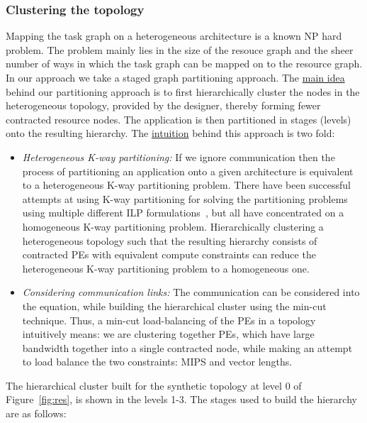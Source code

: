 \subsubsection{Clustering the topology}
\label{sec:clustering-topology}

Mapping the task graph on a heterogeneous architecture is a known NP
hard problem. The problem mainly lies in the size of the resouce graph
and the sheer number of ways in which the task graph can be mapped on to
the resource graph. In our approach we take a staged graph partitioning
approach. The \underline{main idea} behind our partitioning approach is
to first hierarchically cluster the nodes in the heterogeneous topology,
provided by the designer, thereby forming fewer contracted resource
nodes. The application is then partitioned in stages (levels) onto the
resulting hierarchy. The \underline{intuition} behind this approach is
two fold:

\begin{itemize}

\item \textit{Heterogeneous K-way partitioning:} If we ignore
  communication then the process of partitioning an application onto a
  given architecture is equivalent to a heterogeneous K-way partitioning
  problem. There have been successful attempts at using K-way
  partitioning for solving the partitioning problems using multiple
  different ILP formulations~\cite{fsar11}, but all have concentrated on
  a homogeneous K-way partitioning problem. Hierarchically clustering a
  heterogeneous topology such that the resulting hierarchy consists of
  contracted PEs with equivalent compute constraints can reduce the
  heterogeneous K-way partitioning problem to a homogeneous one.

\item \textit{Considering communication links:} The communication can be
  considered into the equation, while building the hierarchical cluster
  using the min-cut technique. Thus, a min-cut load-balancing of the PEs
  in a topology intuitively means: we are clustering together PEs, which
  have large bandwidth together into a single contracted node, while
  making an attempt to load balance the two constraints: MIPS and vector
  lengths.

\end{itemize}

The hierarchical cluster built for the synthetic topology at level 0 of
Figure~\ref{fig:res}, is shown in the levels 1-3. The stages used to
build the hierarchy are as follows:

